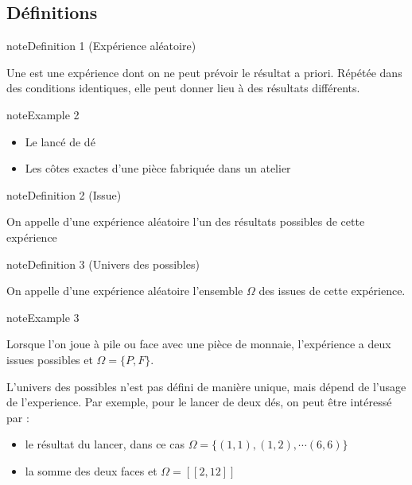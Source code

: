 \documentclass[letterpaper,10pt,english]{jupyterBook}
\begin{document}
\subsection{Définitions}
\label{\detokenize{Rappels:definitions}}\label{Rappels:expalea}
\begin{sphinxadmonition}{note}{Definition 1 (Expérience aléatoire)}



\sphinxAtStartPar
Une  est une expérience dont on ne peut prévoir le résultat a priori. Répétée dans des conditions identiques, elle peut donner lieu à des résultats différents.
\end{sphinxadmonition}
\label{Rappels:example-1}
\begin{sphinxadmonition}{note}{Example 2}


\begin{itemize}
\item {} 
\sphinxAtStartPar
Le lancé de dé

\item {} 
\sphinxAtStartPar
Les côtes exactes d’une pièce fabriquée dans un atelier

\end{itemize}
\end{sphinxadmonition}
\label{Rappels:issue}
\begin{sphinxadmonition}{note}{Definition 2 (Issue)}



\sphinxAtStartPar
On appelle  d’une expérience aléatoire l’un des résultats possibles de cette expérience
\end{sphinxadmonition}
\label{Rappels:univers}
\begin{sphinxadmonition}{note}{Definition 3 (Univers des possibles)}



\sphinxAtStartPar
On appelle  d’une expérience aléatoire l’ensemble  \(\Omega\) des issues de cette expérience.
\end{sphinxadmonition}
\label{Rappels:example-4}
\begin{sphinxadmonition}{note}{Example 3}



\sphinxAtStartPar
Lorsque l’on joue à pile ou face avec une pièce de monnaie, l’expérience a deux issues possibles et \(\Omega = \{P,F\}\).
\end{sphinxadmonition}

\sphinxAtStartPar
L’univers des possibles n’est pas défini de manière unique, mais dépend de l’usage de l’experience. Par exemple, pour le lancer de deux dés, on peut être intéressé par :
\begin{itemize}
\item {} 
\sphinxAtStartPar
le résultat du lancer, dans ce cas \(\Omega = \{(1,1), (1,2), \cdots (6,6)\}\)

\item {} 
\sphinxAtStartPar
la somme des deux faces et \(\Omega = [\![2,12]\!]\)

\end{itemize}
\end{document}
